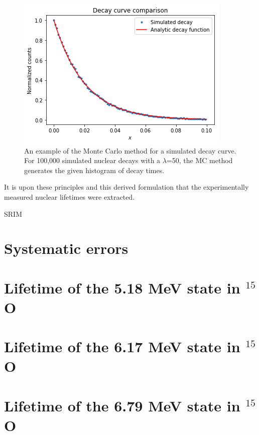 \begin{figure}
\centering
\includegraphics[width=0.85\linewidth]{figures/simCompareExample.png}
\caption{An example of the Monte Carlo method for a simulated decay curve. For 100,000 simulated nuclear decays with a $\lambda$=50, the MC method generates the given histogram of decay times.  }
\label{fig: simCompare}
\end{figure}


It is upon these principles and this derived formulation that the experimentally measured nuclear lifetimes were extracted. 

SRIM \cite{Ziegler2010}


\section{Systematic errors}
\label{sec: systematicErrors}

\section{Lifetime of the 5.18 MeV state in $^{15}$O}
\label{sec: lifetime518}


\section{Lifetime of the 6.17 MeV state in $^{15}$O}
\label{sec: lifetime617}


\section{Lifetime of the 6.79 MeV state in $^{15}$O}
\label{sec: lifetime679}

%
% 
% 
